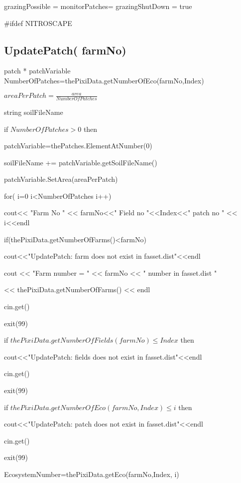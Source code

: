 \documentclass[%
]{scrartcl}
\begin{document}
grazingPossible   =  
   monitorPatches=
   grazingShutDown   = true



\#ifdef NITROSCAPE
\subsection{UpdatePatch( farmNo)}

   patch * patchVariable
	 NumberOfPatches=thePixiData.getNumberOfEco(farmNo,Index)
	 
   $areaPerPatch = \tfrac{area}{NumberOfPatches}$
   
   string soilFileName
   
	if $NumberOfPatches>0$ then	
	
		\quad patchVariable=thePatches.ElementAtNumber(0)
		
        \quad soilFileName += patchVariable.getSoilFileName()
        
        \quad patchVariable.SetArea(areaPerPatch)
	
	for( i=0 i<NumberOfPatches i++)
	
 \quad			cout<< "Farm No " << farmNo<<" Field no "<<Index<<" patch no " << i<<endl

 \quad			if(thePixiData.getNumberOfFarms()<farmNo)
		
 \quad	 \quad				cout<<"UpdatePatch: farm does not exist in fasset.dist"<<endl

 \quad	 \quad				cout << "Farm number = " << farmNo << " number in fasset.dist " 

\quad	 \quad	 << thePixiData.getNumberOfFarms() << endl

  \quad	  \quad	       cin.get()

 \quad	 \quad				exit(99)
		
		
 \quad			if $thePixiData.getNumberOfFields(farmNo) \le Index$ then
		
 \quad	 \quad				cout<<"UpdatePatch: fields does not exist in fasset.dist"<<endl

 \quad	   \quad	       cin.get()
 
 \quad	 \quad				exit(99)
		
 \quad			 if $thePixiData.getNumberOfEco(farmNo,Index)\le i$ then
		
 \quad	 \quad						cout<<"UpdatePatch: patch does not exist in fasset.dist"<<endl

 \quad	  \quad	        		cin.get()

  \quad	\quad						exit(99)
		
 \quad			 EcosystemNumber=thePixiData.getEco(farmNo,Index, i)
\end{document}
